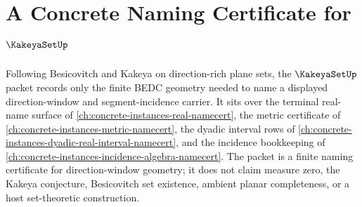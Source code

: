 \chapter{A Concrete Naming Certificate for $\KakeyaSetUp$}
\label{ch:concrete-instances-kakeya-set-namecert}

Following Besicovitch and Kakeya on direction-rich plane sets, the $\KakeyaSetUp$ packet records only the finite BEDC geometry needed to name a displayed direction-window and segment-incidence carrier. It sits over the terminal real-name surface of \autoref{ch:concrete-instances-real-namecert}, the metric certificate of \autoref{ch:concrete-instances-metric-namecert}, the dyadic interval rows of \autoref{ch:concrete-instances-dyadic-real-interval-namecert}, and the incidence bookkeeping of \autoref{ch:concrete-instances-incidence-algebra-namecert}. The packet is a finite naming certificate for direction-window geometry; it does not claim measure zero, the Kakeya conjecture, Besicovitch set existence, ambient planar completeness, or a host set-theoretic construction.

